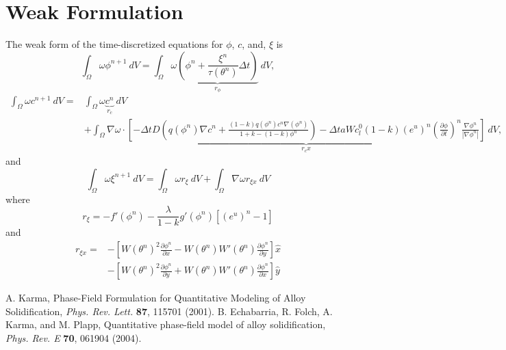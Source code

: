 \documentclass[10pt]{article}
\begin{document}
\section{Weak Formulation}
The weak form of the time-discretized equations for $\phi$,  $c$, and, $\xi$ is
\begin{equation}
\int_{\Omega}   \omega  \phi^{n+1}  ~dV = \int_{\Omega}   \omega \underbrace{\left(\phi^n + \frac{ \xi^n}{\tau(\theta^n)}\Delta t\right)}_{r_{\phi}} ~dV,
\end{equation}
\begin{equation}
\begin{split}
\int_{\Omega}   \omega  c^{n+1}  ~dV =& 
\int_{\Omega} \omega \underbrace{ c^{n} }_{r_c}~dV\\
&+\int_{\Omega}  \nabla  \omega  \cdot \underbrace{\left[-\Delta t D\left(q(\phi^n)\nabla c^n + \frac{(1-k)q(\phi^n)c^n\nabla(\phi^n)}{1+k-(1-k)\phi^n}\right)-\Delta t aWc_l^0(1-k)(e^u)^n \left(\frac{\partial \phi}{\partial t}\right)^n\frac{\nabla \phi^n}{|\nabla \phi^n|} \right]}_{r_cx}~dV,
\end{split}
\end{equation}
\newpage
and
\begin{equation}
\int_{\Omega}   \omega \xi^{n+1} ~dV =\int_{\Omega} \omega r_\xi ~dV + \int_{\Omega} \nabla \omega r_{\xi x} ~dV
\end{equation}
where
\begin{equation}
r_\xi= -f'(\phi^n) - \frac{\lambda}{1-k} g'(\phi^n)[(e^u)^n - 1]
\end{equation}
and 
\begin{equation}
\begin{split}
r_{\xi x}= &-\left[W(\theta^n)^2\frac{\partial \phi^n}{\partial x}-W(\theta^n)W'(\theta^n)\frac{\partial \phi^n}{\partial y}\right]\hat{x}\\
&-\left[W(\theta^n)^2\frac{\partial \phi^n}{\partial y}+W(\theta^n)W'(\theta^n)\frac{\partial \phi^n}{\partial x}\right]\hat{y}
\end{split}
\end{equation}

\begin{thebibliography}{plain}
     A. Karma, Phase-Field Formulation for Quantitative Modeling of Alloy Solidification, \emph{Phys. Rev. Lett.} {\bf 87}, 115701 (2001).
      B. Echabarria, R. Folch, A. Karma, and M. Plapp, Quantitative phase-field model of alloy solidification, \emph{Phys. Rev. E} {\bf 70}, 061904 (2004).
\end{thebibliography}
\end{document}

